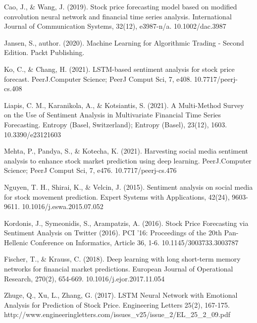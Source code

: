 \documentclass{llncs}
\begin{document}
\begin{thebibliography}{8}

\label{ref_article1} 
Cao, J., \& Wang, J. (2019). Stock price forecasting model based on modified convolution neural network and financial time series analysis. International Journal of Communication Systems, 32(12), e3987-n/a. 10.1002/dac.3987

\label{ref_article2} 
Jansen, S., author. (2020). Machine Learning for Algorithmic Trading - Second Edition. Packt Publishing.

\label{ref_article3} 
Ko, C., \& Chang, H. (2021). LSTM-based sentiment analysis for stock price forecast. PeerJ.Computer Science; PeerJ Comput Sci, 7, e408. 10.7717/peerj-cs.408

\label{ref_article4} 
Liapis, C. M., Karanikola, A., \& Kotsiantis, S. (2021). A Multi-Method Survey on the Use of Sentiment Analysis in Multivariate Financial Time Series Forecasting. Entropy (Basel, Switzerland); Entropy (Basel), 23(12), 1603. 10.3390/e23121603

\label{ref_article5} 
Mehta, P., Pandya, S., \& Kotecha, K. (2021). Harvesting social media sentiment analysis to enhance stock market prediction using deep learning. PeerJ.Computer Science; PeerJ Comput Sci, 7, e476. 10.7717/peerj-cs.476

\label{ref_article6} 
Nguyen, T. H., Shirai, K., \& Velcin, J. (2015). Sentiment analysis on social media for stock movement prediction. Expert Systems with Applications, 42(24), 9603-9611. 10.1016/j.eswa.2015.07.052

\label{ref_article7} 
Kordonis, J., Symeonidis, S., Arampatzis, A. (2016). Stock Price Forecasting via Sentiment Analysis on Twitter (2016). PCI ’16: Proceedings of the 20th Pan-Hellenic Conference on Informatics, Article 36, 1-6. 10.1145/3003733.3003787

\label{ref_article8} 
Fischer, T., \& Krauss, C. (2018). Deep learning with long short-term memory networks for financial market predictions. European Journal of Operational Research, 270(2), 654-669. 10.1016/j.ejor.2017.11.054

\label{ref_article9} 
Zhuge, Q., Xu, L., Zhang, G. (2017). LSTM Neural Network with Emotional Analysis for Prediction of Stock Price. Engineering Letters 25(2), 167-175. http://www.engineeringletters.com/issues\_v25/issue\_2/EL\_25\_2\_09.pdf


\end{thebibliography}
\end{document}
